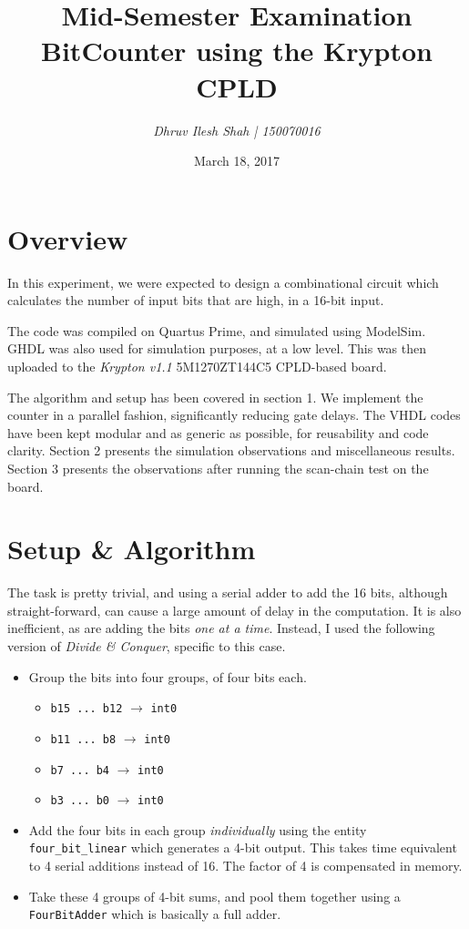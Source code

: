 \documentclass[a4paper, 11pt]{article}
\title{\bf Mid-Semester Examination\\\vspace*{2mm} BitCounter using the Krypton CPLD}
\author{\it Dhruv Ilesh Shah | 150070016}
\date{March 18, 2017}
\begin{document}
\maketitle
\section*{Overview}
In this experiment, we were expected to design a combinational circuit which calculates the number of input bits that are high, in a 16-bit input.

The code was compiled on Quartus Prime, and simulated using ModelSim. GHDL was also used for simulation purposes, at a low level. This was then uploaded to the {\em Krypton v1.1} 5M1270ZT144C5 CPLD-based board.

The algorithm and setup has been covered in section 1. We implement the counter in a parallel fashion, significantly reducing gate delays. The VHDL codes have been kept modular and as generic as possible, for reusability and code clarity. Section 2 presents the simulation observations and miscellaneous results. Section 3 presents the observations after running the scan-chain test on the board.

\section{Setup \& Algorithm}
The task is pretty trivial, and using a serial adder to add the 16 bits, although straight-forward, can cause a large amount of delay in the computation. It is also inefficient, as are adding the bits \emph{one at a time}. Instead, I used the following version of \emph{Divide \& Conquer}, specific to this case.

\begin{itemize}
	\item Group the bits into four groups, of four bits each.
	\begin{itemize}
		\item \texttt{b15 ... b12} $\rightarrow$ \texttt{int0}
		\item \texttt{b11 ... b8} $\rightarrow$ \texttt{int0}
		\item \texttt{b7 ... b4} $\rightarrow$ \texttt{int0}
		\item \texttt{b3 ... b0} $\rightarrow$ \texttt{int0}
	\end{itemize}
	\item Add the four bits in each group \emph{individually} using the entity \texttt{four\_bit\_linear} which generates a 4-bit output. This takes time equivalent to 4 serial additions instead of 16. The factor of 4 is compensated in memory.
	\item Take these 4 groups of 4-bit sums, and pool them together using a \texttt{FourBitAdder} which is basically a full adder.
\end{itemize}
\end{document}
